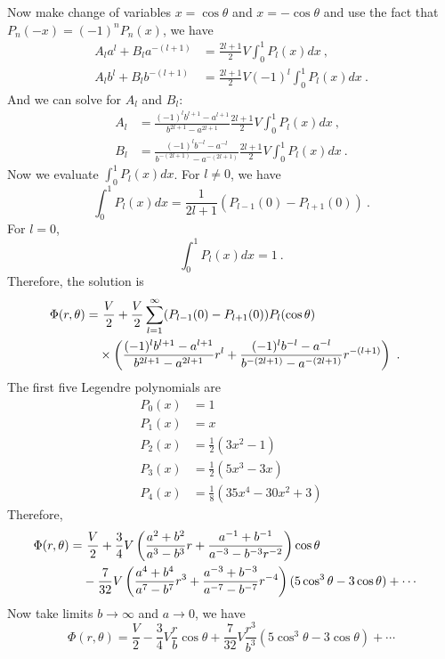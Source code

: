 \documentclass[12pt]{article}
\begin{document}
Now make change of variables $x = \cos \theta$ and $x = - \cos \theta$ and use the fact that $P_n(-x) = (-1)^n P_n(x)$, we have
\begin{align}
    A_l a^l + B_l a^{-(l+1)} &= \frac{2l+1}{2} V \int_0^1 P_l(x) dx~,\\
    A_l b^l + B_l b^{-(l+1)} &= \frac{2l+1}{2} V (-1)^l \int_0^1 P_l(x) dx~.
\end{align}
And we can solve for $A_l$ and $B_l$:
\begin{align}
    A_l &= \frac{(-1)^l b^{l+1} - a^{l+1}}{b^{2l+1} - a^{2l+1}} \frac{2l+1}{2} V \int_0^1 P_l(x) dx~,\\
    B_l &= \frac{(-1)^l b^{-l} - a^{-l}}{b^{-(2l+1)} - a^{-(2l+1)}} \frac{2l+1}{2} V \int_0^1 P_l(x) dx~.
\end{align}
Now we evaluate $\int_0^1 P_l(x) dx$. For $l \neq 0$, we have
\begin{equation}
    \int_0^1 P_l(x)dx = \frac{1}{2l+1} (P_{l-1}(0) - P_{l+1}(0))~.
\end{equation}
For $l = 0$,
\begin{equation}
    \int_0^1 P_l(x)dx = 1~.
\end{equation}
Therefore, the solution is
\begin{align}
    \Phi(r, \theta) =&~ \frac{V}{2} + \frac{V}{2}\sum_{l = 1}^\infty (P_{l-1}(0) - P_{l+1}(0)) P_l(\cos \theta) \cr
    &\times \left(
        \frac{(-1)^l b^{l+1} - a^{l+1} }{b^{2l+1} - a^{2l+1} }r^l + \frac{(-1)^l b^{-l}-a^{-l} }{b^{-(2l+1)} - a^{-(2l+1)} } r^{-(l+1)}
    \right)~.
\end{align}
The first five Legendre polynomials are
\begin{align}
    P_0(x) &= 1\\
    P_1(x) &= x\\
    P_2(x) &=\frac12(3x^2 - 1)\\
    P_3(x) &=\frac12(5x^3 - 3x)\\
    P_4(x) &=\frac{1}{8}(35 x^4 - 30x^2 +3)
\end{align}
Therefore,
\begin{align}
    \Phi(r, \theta) =&~ \frac V2 + \frac{3}{4}V \left( \frac{a^2 + b^2}{a^3 - b^3} r + \frac{a^{-1} + b^{-1}}{a^{-3} - b^{-3} r^{-2}}\right) \cos \theta\cr
    & - \frac{7}{32} V \left( \frac{a^4 + b^4}{a^7 - b^7}r^3 + \frac{a^{-3}+b^{-3} }{a^{-7} - b^{-7}} r^{-4} \right)(5 \cos^3 \theta - 3\cos \theta) + \cdots
\end{align}
Now take limits $b \to \infty$ and $a \to 0$, we have
\begin{equation}
    \Phi(r, \theta) = \frac V2 - \frac{3}{4} V \frac{r}{b}\cos \theta + \frac{7}{32} V \frac{r^3}{b^3} (5 \cos^3 \theta - 3\cos \theta)+\cdots
\end{equation}
\end{document}
